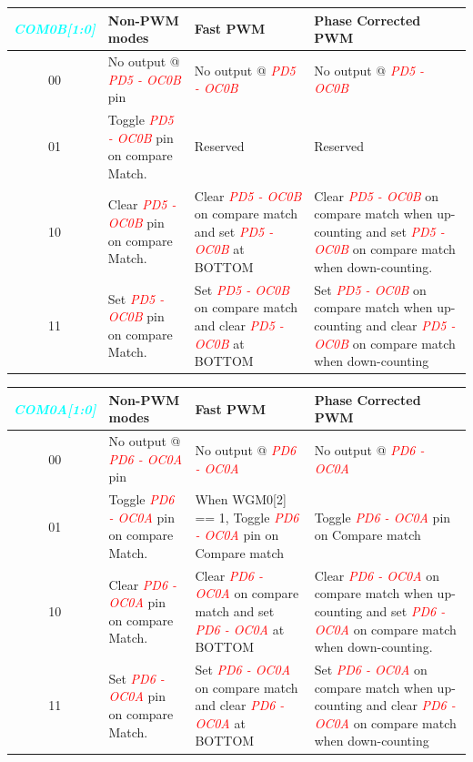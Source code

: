 \documentclass{article}
\newcommand{\bitFormat}[1]{\emph{\textbf{\textcolor{cyan}{#1}}}}
\newcommand{\pinFormat}[1]{\emph{\textcolor{red}{#1}}}
\begin{document}
\begin{table}[H]
    \begin{center}
        \begin{tabular}{c|p{4cm}|p{5.2cm}|p{5.2cm}}
            \bitFormat{COM0B[1:0]} & Non-PWM modes & Fast PWM & Phase Corrected PWM\\
            \hline
            00 & No output @ \pinFormat{PD5 - OC0B} pin &  No output @ \pinFormat{PD5 - OC0B} & No output @ \pinFormat{PD5 - OC0B}\\
            \hline
            01 & Toggle \pinFormat{PD5 - OC0B} pin on compare Match. & Reserved & Reserved\\
            \hline
            10 & Clear \pinFormat{PD5 - OC0B} pin on compare Match. & Clear \pinFormat{PD5 - OC0B} on compare match and  set \pinFormat{PD5 - OC0B} at BOTTOM & Clear \pinFormat{PD5 - OC0B} on compare match when up-counting and set \pinFormat{PD5 - OC0B} on compare match when down-counting.\\
            \hline
            11 & Set \pinFormat{PD5 - OC0B} pin on compare Match. & Set \pinFormat{PD5 - OC0B} on compare match and clear \pinFormat{PD5 - OC0B} at BOTTOM & Set \pinFormat{PD5 - OC0B} on compare match when up-counting and clear \pinFormat{PD5 - OC0B} on compare match when down-counting\\
        \end{tabular}
    \end{center}
\end{table}

\begin{table}[H]
    \begin{center}
        \begin{tabular}{c|p{4cm}|p{5.2cm}|p{5.2cm}}
            \bitFormat{COM0A[1:0]} & Non-PWM modes & Fast PWM & Phase Corrected PWM\\
            \hline
            00 & No output @ \pinFormat{PD6 - OC0A} pin &  No output @ \pinFormat{PD6 - OC0A} & No output @ \pinFormat{PD6 - OC0A}\\
            \hline
            01 & Toggle \pinFormat{PD6 - OC0A} pin on compare Match. & When WGM0[2] == 1, Toggle \pinFormat{PD6 - OC0A}  pin on Compare match & Toggle \pinFormat{PD6 - OC0A}  pin on Compare match\\
            \hline
            10 & Clear \pinFormat{PD6 - OC0A} pin on compare Match. & Clear \pinFormat{PD6 - OC0A} on compare match and  set \pinFormat{PD6 - OC0A} at BOTTOM & Clear \pinFormat{PD6 - OC0A} on compare match when up-counting and set \pinFormat{PD6 - OC0A} on compare match when down-counting.\\
            \hline
            11 & Set \pinFormat{PD6 - OC0A} pin on compare Match. & Set \pinFormat{PD6 - OC0A} on compare match and  clear \pinFormat{PD6 - OC0A} at BOTTOM & Set \pinFormat{PD6 - OC0A} on compare match when up-counting and clear \pinFormat{PD6 - OC0A} on compare match when down-counting\\
        \end{tabular}
    \end{center}
\end{table}
\end{document}
